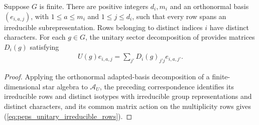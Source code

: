 \begin{lemma}
    \label{thm:peps_unitary_irreducible_blocks}
    \leanok
    Suppose $G$ is finite. There are positive integers $d_i,m_i$ and an
    orthonormal basis $(e_{i,a,j})$, with $1\leq a\leq m_i$ and
    $1\leq j\leq d_i$, such that every row spans an irreducible
    subrepresentation. Rows belonging to distinct indices $i$ have
    distinct characters. For each $g\in G$, the unitary sector decomposition of
    \cite[Sections~4.1 and~7]{Schuch2010PEPS} provides matrices $D_i(g)$
    satisfying
    \begin{align}
        U(g)e_{i,a,j}=\sum_{j'}D_i(g)_{j'j}e_{i,a,j'}.
        \label{eq:peps_unitary_irreducible_rows}
    \end{align}
\end{lemma}
\begin{proof}\leanok
    Applying the orthonormal adapted-basis decomposition of a
    finite-dimensional star algebra to $\mathcal A_U$, the preceding
    correspondence identifies its irreducible rows and distinct isotypes with
    irreducible group representations and distinct characters, and its common
    matrix action on the multiplicity rows gives
    (\ref{eq:peps_unitary_irreducible_rows}).
\end{proof}
